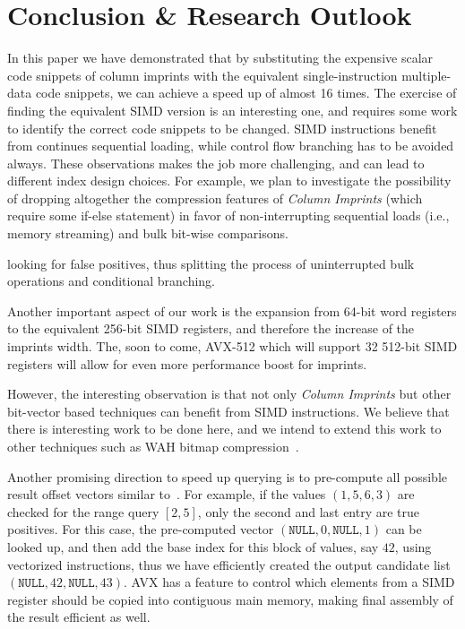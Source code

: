 \documentclass[sigconf]{acmart}
\begin{document}
\section{Conclusion \& Research Outlook}\label{sec:conclusion}

In this paper we have demonstrated that by substituting the expensive scalar code snippets of column imprints with the equivalent
single-instruction multiple-data code snippets, we can achieve a speed up of almost 16 times. The exercise of finding the equivalent
SIMD version is an interesting one, and requires some work to identify the correct code snippets to be changed. SIMD instructions
benefit from continues sequential loading, while control flow branching has to be avoided always. These observations makes the job
more challenging, and can lead to different index design choices. For example, we plan to investigate the possibility of dropping
altogether the compression features of {\em Column Imprints} (which require some if-else statement) in favor of non-interrupting
sequential loads (i.e., memory streaming) and bulk bit-wise comparisons. 

looking for false positives, thus splitting the process of uninterrupted bulk operations and conditional branching.

Another important aspect of our work is the expansion from 64-bit word registers to the equivalent 256-bit SIMD registers, and
therefore the increase of the imprints width. The, soon to come, AVX-512 which will support 32 512-bit SIMD registers will allow
for even more performance boost for imprints.

However, the interesting observation is that not only {\em Column Imprints} but other bit-vector based techniques can benefit from SIMD
instructions. We believe that there is interesting work to be done here, and we intend to extend this work to other techniques such as
WAH bitmap compression~\cite{Wu:2006:OBI:1132863.1132864}. 

Another promising direction to speed up querying is to pre-compute all possible result offset vectors similar
to~\cite{DBLP:conf/sigmod/LangMFB0K16}. For example, if the values $(1,5,6,3)$ are checked for the range query $[2,5]$, only the second and last
entry are true positives. For this case, the pre-computed vector $(\mathtt{NULL}, 0, \mathtt{NULL}, 1)$ can be looked up, and then add the base
index for this block of values, say $42$, using vectorized instructions, thus we have efficiently created the output candidate list
$(\mathtt{NULL}, 42, \mathtt{NULL}, 43)$. AVX has a feature to control which elements from a SIMD register should be copied into contiguous
main memory, making final assembly of the result efficient as well.
\end{document}
